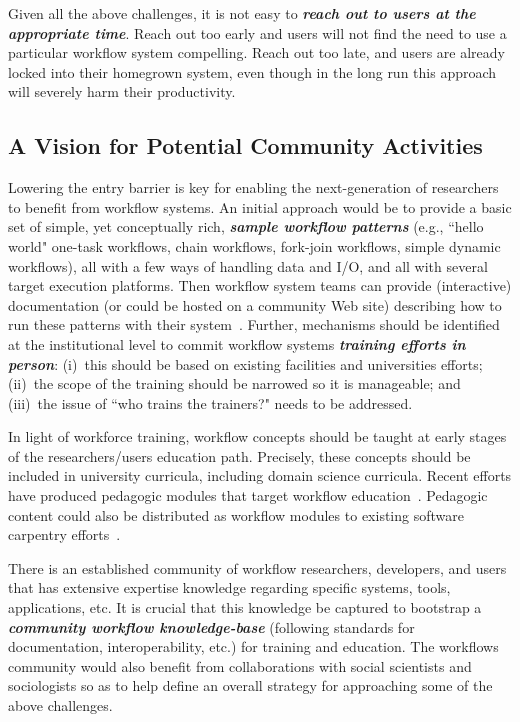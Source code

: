 Given all the above challenges, it is not easy to \textbf{\emph{reach out to users at the appropriate time}}. Reach out too early and users will not find the need to use a particular workflow system compelling. Reach out too late, and users are already locked into their homegrown system, even though in the long run this approach will severely harm their productivity.


\subsection{A Vision for Potential Community Activities}

Lowering the entry barrier is key for enabling the next-generation of researchers to benefit from workflow systems. An initial approach would be to provide a basic set of simple, yet conceptually rich, \textbf{\emph{sample workflow patterns}} (e.g., ``hello world" one-task workflows, chain workflows, fork-join workflows, simple dynamic workflows), all with a few ways of handling data and I/O, and all with several target execution platforms. Then workflow system teams can provide (interactive) documentation (or could be hosted on a community Web site) describing how to run these patterns with their system~\cite{nersc-workflows}. Further, mechanisms should be identified at the institutional level to commit workflow systems \textbf{\emph{training efforts in person}}: (i)~this should be based on existing facilities and universities efforts; (ii)~the scope of the training should be narrowed so it is manageable; and (iii)~the issue of ``who trains the trainers?" needs to be addressed. 

In light of workforce training, workflow concepts should be taught at early stages of the researchers/users education path. Precisely, these concepts should be included in university curricula, including domain science curricula. Recent efforts have produced pedagogic modules that target workflow education~\cite{casanova2021eduwrench, eduwrench}. Pedagogic content could also be distributed as workflow modules to existing software carpentry efforts~\cite{swcarpentry}.

There is an established community of workflow researchers, developers, and users that has extensive expertise knowledge regarding specific systems, tools, applications, etc. It is crucial that this knowledge be captured to bootstrap a \textbf{\emph{community workflow knowledge-base}} (following standards for documentation, interoperability, etc.) for training and education. The workflows community would also benefit from collaborations with social scientists and sociologists so as to help define an overall strategy for approaching some of the above challenges.
